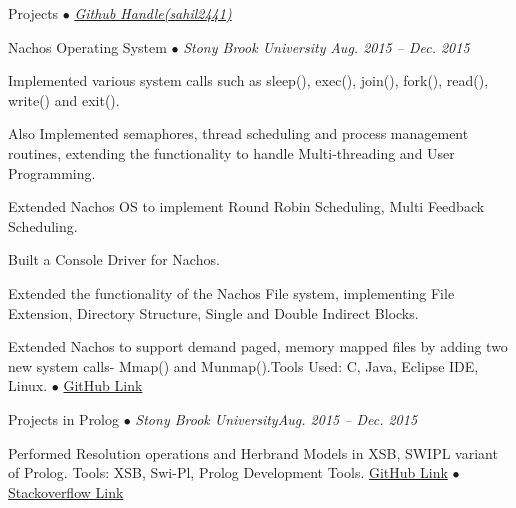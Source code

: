 \documentclass{resume} %
\begin{document}

\begin{rSection}{Projects {$\bullet$} \emph{\href{http://www.github.com/sahil2441}{\footnotesize Github Handle(sahil2441)}}}

\begin{rSubsection}{Nachos Operating System {\tiny$\bullet$} \emph{Stony Brook University}} {\emph {Aug. 2015 -- Dec. 2015}}{}{}
\item Implemented various system calls such as sleep(), exec(), join(), fork(), read(), write() and exit().
\item Also Implemented semaphores, thread scheduling and process management routines, extending
     the functionality to handle Multi-threading and User Programming.
\item Extended Nachos OS to implement Round Robin Scheduling, Multi Feedback Scheduling.
\item Built a Console Driver for Nachos.
\item Extended the functionality of the Nachos File system, implementing File Extension, Directory Structure,  Single and 
      Double Indirect Blocks.
\item Extended Nachos to support demand paged, memory mapped files by adding two new system calls- Mmap() and
      Munmap().Tools Used: C, Java, Eclipse IDE, Linux. {\tiny$\bullet$}     
\href{https://github.com/sahil2441/Nachos-Operating-System}{GitHub Link}

\end{rSubsection}


\begin{rSubsection}{Projects in Prolog {\tiny$\bullet$} \emph{Stony Brook University}}{\emph{Aug. 2015 -- Dec. 2015}}{}{}
\item Performed Resolution operations and Herbrand Models in XSB, SWIPL variant of Prolog. Tools: XSB, Swi-Pl, Prolog Development Tools.
\href{https://github.com/sahil2441/Prolog-Problems}{GitHub Link}
{\tiny$\bullet$}
\href{http://stackoverflow.com/users/2733964/sahil-jain}{Stackoverflow Link}
\end{rSubsection}



\end{rSection}
\end{document}
